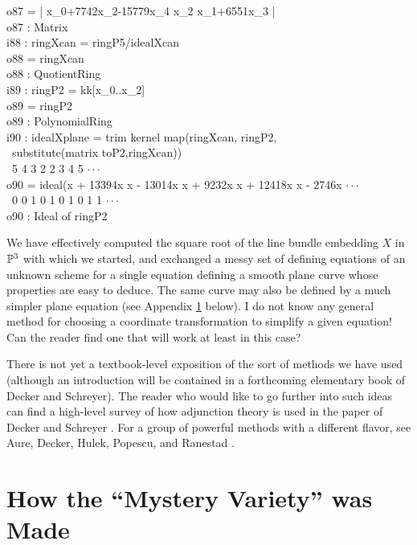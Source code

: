 \emptyLine
o87 = | x_0+7742x_2-15779x_4 x_2 x_1+6551x_3 |\\
\emptyLine
o87 : Matrix\\
\endOutput
\beginOutput
i88 : ringXcan = ringP5/idealXcan\\
\emptyLine
o88 = ringXcan\\
\emptyLine
o88 : QuotientRing\\
\endOutput
\beginOutput
i89 : ringP2 = kk[x_0..x_2]\\
\emptyLine
o89 = ringP2\\
\emptyLine
o89 : PolynomialRing\\
\endOutput
\beginOutput
i90 : idealXplane = trim kernel map(ringXcan, ringP2, \\
\                                        substitute(matrix toP2,ringXcan))\\
\emptyLine
\             5         4           3 2        2 3           4        5 $\cdot\cdot\cdot$\\
o90 = ideal(x  + 13394x x  - 13014x x  + 9232x x  + 12418x x  - 2746x  $\cdot\cdot\cdot$\\
\             0         0 1         0 1        0 1         0 1        1 $\cdot\cdot\cdot$\\
\emptyLine
o90 : Ideal of ringP2\\
\endOutput

We have effectively computed the square root of the line bundle
embedding $X$ in $\P^3$ with which we started, and exchanged a messy
set of defining equations of an unknown scheme for a single equation
defining a smooth plane curve whose properties are easy to deduce.
The  same curve may also be defined by a much simpler plane equation
(see Appendix \ref{How} below). I do not know any general method for choosing
a coordinate transformation to simplify a given equation! Can the
reader find one that will work at least in this case?

There is not yet a textbook-level exposition of the
sort of methods we have used
(although an introduction
will be contained in a forthcoming elementary book
of Decker and Schreyer). 
The reader who would like to go further into
such ideas can find a high-level survey of how adjunction theory
is used
in the paper of Decker and Schreyer \cite{ds}.
For a group of powerful methods with a different flavor,
see Aure, Decker, Hulek, Popescu, and
Ranestad \cite{adhpr}.


\appendix

\section{How the ``Mystery Variety'' was Made}\label{How}

